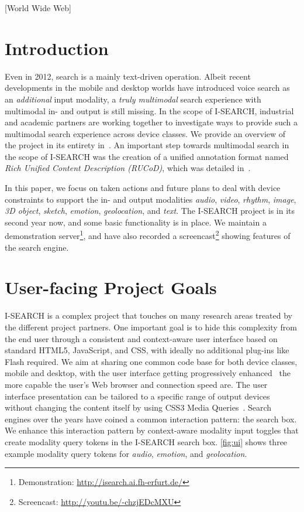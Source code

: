 \documentclass{sig-alternate}
\let\oldemph\emph
\renewcommand{\emph}[1]{\oldemph{\fontsize{9}{9}\selectfont #1}}
\newcommand{\inlinelistingsize}{\fontsize{8pt}{11pt}}
\let\oldurl\url
\renewcommand{\url}[1]{\inlinelistingsize\oldurl{#1}}
\begin{document}
[World Wide Web]



\section{Introduction} \label{sec:introduction}
Even in 2012, search is a mainly text-driven operation.
Albeit recent developments in the mobile and desktop worlds have introduced voice search as an \emph{additional} input modality, a \emph{truly multimodal} search experience with multimodal in- and output is still missing.
In the scope of \mbox{I-SEARCH}, industrial and academic partners are working together to investigate ways to provide such a multimodal search experience across device classes.
We provide an overview of the project in its entirety in~\cite{www2012}.
An important step towards multimodal search in the scope of \mbox{I-SEARCH} was the creation of a unified annotation format named \emph{Rich Unified Content Description (RUCoD)}, which was detailed in~\cite{ijmis2010}.

In this paper, we focus on taken actions and future plans to deal with device constraints to support the in- and output modalities \emph{audio}, \emph{video}, \emph{rhythm}, \emph{image}, \emph{3D object}, \emph{sketch}, \emph{emotion}, \emph{geolocation}, and \emph{text}.
The \mbox{I-SEARCH} project is in its second year now, and some basic functionality is in place.
We maintain a demonstration server\footnote{Demonstration: \url{http://isearch.ai.fh-erfurt.de/}}, and have also recorded a screencast\footnote{Screencast: \url{http://youtu.be/-chzjEDcMXU}} showing features of the search engine.

\section{User-facing Project Goals} \label{sec:projectgoals}
\mbox{I-SEARCH} is a complex project that touches on many research areas treated by the different project partners.
One important goal is to hide this complexity from the end user through a consistent and context-aware user interface based on standard HTML5, JavaScript, and CSS, with ideally no additional plug-ins like Flash required.
We aim at sharing one common code base for both device classes, mobile and desktop, with the user interface getting progressively enhanced~\cite{progressiveenhancement} the more capable the user's Web browser and connection speed are.
The user interface presentation can be tailored to a specific range of output devices without changing the content itself by using CSS3 Media Queries~\cite{mediaqueries}.
Search engines over the years have coined a common interaction pattern: the search box.
We enhance this interaction pattern by context-aware modality input toggles that create modality query tokens in the \mbox{I-SEARCH} search box.
\autoref{fig:ui} shows three example modality query tokens for \emph{audio}, \emph{emotion}, and \emph{geolocation}.
\end{document}
